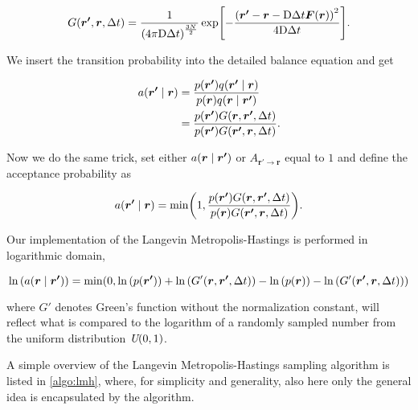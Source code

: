\begin{equation}
    G\qty(\bm{r'}, \bm{r}, \Delta t) = \frac{1}{\qty(4\pi\mathrm{D}\Delta t)^{\frac{3N}{2}}}\exp[-\frac{\qty(\bm{r'}-\bm{r}-\mathrm{D}\Delta t\bm{F}\qty(\bm{r}))^2}{4\mathrm{D}\Delta t}].
\end{equation}

We insert the transition probability into the detailed balance equation and get 

\begin{align*}
    a\qty(\bm{r'}\mid\bm{r})&= \frac{p\qty({\bm{r'}})q\qty(\bm{r'}\mid\bm{r})}{p\qty({\bm{r}})q\qty(\bm{r}\mid\bm{r'})}
    \\
    &= \frac{p\qty({\bm{r'}})G\qty(\bm{r}, \bm{r'}, \Delta t)}{p\qty({\bm{r'}})G\qty(\bm{r'}, \bm{r}, \Delta t)}.
\end{align*}

Now we do the same trick, set either $a\qty(\bm{r}\mid\bm{r'})$ or $A_{\bm{r'}\to\bm{r}}$ equal to $1$ and define the acceptance probability as 

\begin{equation}
    a\qty(\bm{r'}\mid\bm{r}) = \mathrm{min}\qty(1, \frac{p\qty({\bm{r'}})G\qty(\bm{r}, \bm{r'}, \Delta t)}{p\qty({\bm{r}})G\qty(\bm{r'}, \bm{r}, \Delta t)}).
\end{equation}

Our implementation of the Langevin Metropolis-Hastings is performed in logarithmic domain,  

\begin{equation}
    \ln{\qty(a\qty(\bm{r}\mid\bm{r'}))} = \mathrm{min}\qty(0, \ln{\qty(p\qty(\bm{r'}))} + \ln{\qty(G'\qty(\bm{r}, \bm{r'}, \Delta t))} - \ln{\qty(p\qty(\bm{r}))}-\ln{\qty(G'\qty(\bm{r'}, \bm{r}, \Delta t))})
\end{equation}

where $G'$ denotes Green's function without the normalization constant, will reflect what is compared to the logarithm of a randomly sampled number from the uniform distribution $\textit{U}\qty(0, 1)$. 

A simple overview of the Langevin Metropolis-Hastings sampling algorithm is listed in \autoref{algo:lmh}, where, for simplicity and generality, also here only the general idea is encapsulated by the algorithm. 

